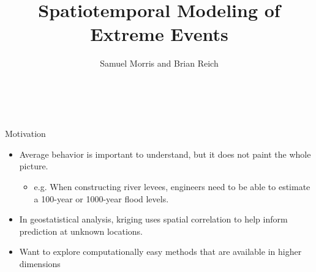 \documentclass{beamer}
\title[Spatiotemporal Modeling of Extreme Events] %
{
  Spatiotemporal Modeling of Extreme Events
}
\author[S. Morris and B. Reich]{Samuel Morris and Brian Reich}
\institute[NCSU]{North Carolina State University}
\date{}
\begin{document}
\begin{frame}\frametitle{\ }
\begin{center}
	\maketitle
\end{center}
\end{frame}

\begin{frame}{Motivation}
  \begin{itemize} \setlength{\itemsep}{1em}
    \item Average behavior is important to understand, but it does not paint the whole picture.
    \begin{itemize}
      \item e.g. When constructing river levees, engineers need to be able to estimate a 100-year or 1000-year flood levels.
    \end{itemize}
    \item In geostatistical analysis, kriging uses spatial correlation to help inform prediction at unknown locations.
    \item Want to explore computationally easy methods that are available in higher dimensions
  \end{itemize}
\end{frame}

\end{document}
